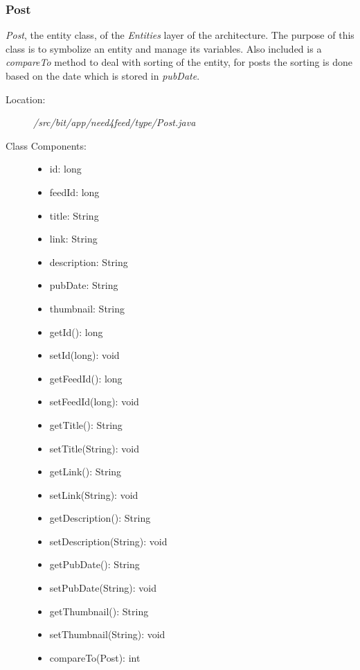 \subsubsection{Post}
\textit{Post}, the entity class, of the \textit{Entities} layer of the architecture. The purpose of this class is to symbolize an entity and manage its variables. Also included is a \textit{compareTo} method to deal with sorting of the entity, for posts the sorting is done based on the date which is stored in \textit{pubDate}.
\begin{description}
  \item[Location:] \textit{/src/bit/app/need4feed/type/Post.java} \hfill
  \item[Class Components:] \hfill
     \begin{itemize}
        \item id: long
        \item feedId: long
        \item title: String
        \item link: String
        \item description: String
        \item pubDate: String
        \item thumbnail: String
		\item getId(): long 
		\item setId(long): void
		\item getFeedId(): long 
		\item setFeedId(long): void
		\item getTitle(): String 
		\item setTitle(String): void
		\item getLink(): String 
		\item setLink(String): void
		\item getDescription(): String 
		\item setDescription(String): void
		\item getPubDate(): String 
		\item setPubDate(String): void
		\item getThumbnail(): String 
		\item setThumbnail(String): void
		\item compareTo(Post): int
     \end{itemize}
\end{description}


